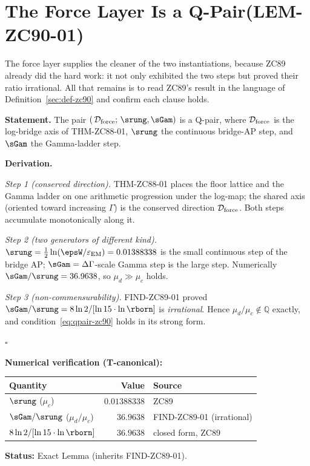 \documentclass[12pt, a4paper]{article}
\renewcommand{\epsEM}{\varepsilon_{\rm EM}}     %
\begin{document}
\section{The Force Layer Is a Q-Pair\quad(LEM-ZC90-01)}
\label{sec:lem01-zc90}

The force layer supplies the cleaner of the two instantiations, because
ZC89 already did the hard work: it not only exhibited the two steps but
proved their ratio irrational. All that remains is to read ZC89's result
in the language of Definition~\ref{sec:def-zc90} and confirm each clause holds.

\begin{formalbox}[title={LEM-ZC90-01: The Force-Layer Pair Is a Q-Pair
  ($R_0$, Exact)}]

\textbf{Statement.} The pair $(\,\mathcal{D}_{\rm force};\,\srung,\sGam)$
is a Q-pair, where $\mathcal{D}_{\rm force}$ is the log-bridge axis of
THM-ZC88-01, $\srung$ the continuous bridge-AP step, and $\sGam$ the
Gamma-ladder step.

\textbf{Derivation.}

\textit{Step 1 (conserved direction).}
THM-ZC88-01 places the floor lattice and the Gamma ladder on one
arithmetic progression under the log-map; the shared axis (oriented
toward increasing $\Gamma$) is the conserved direction $\mathcal{D}_{\rm
force}$. Both steps accumulate monotonically along it.

\textit{Step 2 (two generators of different kind).}
$\srung=\tfrac12\ln(\epsW/\epsEM)=0.01388338$ is the small continuous
step of the bridge AP; $\sGam=\Delta\Gamma$-scale Gamma step is the large
step. Numerically $\sGam/\srung=36.9638$, so $\mu_d\gg\mu_c$ holds.

\textit{Step 3 (non-commensurability).}
FIND-ZC89-01 proved
$\sGam/\srung=8\ln2/[\ln15\cdot\ln\rborn]$ is \emph{irrational}. Hence
$\mu_d/\mu_c\notin\mathbb{Q}$ exactly, and condition~\eqref{eq:qpair-zc90}
holds in its strong form.

\hfill$\square$

\textbf{Numerical verification (T-canonical):}
\begin{center}
{\small\renewcommand{\arraystretch}{1.25}
\begin{tabular}{@{}lrl@{}}
\toprule
Quantity & Value & Source \\
\midrule
$\srung$ ($\mu_c$)        & $0.01388338$ & ZC89 \\
$\sGam/\srung$ ($\mu_d/\mu_c$) & $36.9638$ & FIND-ZC89-01 (irrational) \\
$8\ln2/[\ln15\cdot\ln\rborn]$  & $36.9638$ & closed form, ZC89 \\
\bottomrule
\end{tabular}}
\end{center}

\textbf{Status:} Exact Lemma (inherits FIND-ZC89-01).
\end{formalbox}
\end{document}
